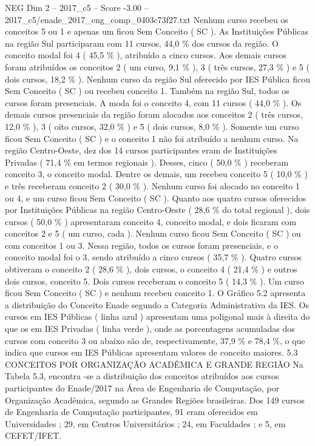 \begin{textsample}{NEG Dim 2 – 2017\_c5 – Score -3.00 – 2017\_c5/enade\_2017\_eng\_comp\_0403c73f27.txt}
Nenhum curso recebeu os conceitos 5 ou 1 e apenas um ficou Sem Conceito ( SC ).
As Instituições Públicas na região Sul participaram com 11 cursos, 44,0 \% dos cursos da região.
O conceito modal foi 4 ( 45,5 \% ), atribuído a cinco cursos.
Aos demais cursos foram atribuídos os conceitos 2 ( um curso, 9,1 \% ), 3 ( três cursos, 27,3 \% ) e 5 ( dois cursos, 18,2 \% ).
Nenhum curso da região Sul oferecido por IES Pública ficou Sem Conceito ( SC ) ou recebeu conceito 1.
Também na região Sul, todos os cursos foram presenciais.
A moda foi o conceito 4, com 11 cursos ( 44,0 \% ).
Os demais cursos presenciais da região foram alocados aos conceitos 2 ( três cursos, 12,0 \% ), 3 ( oito cursos, 32,0 \% ) e 5 ( dois cursos, 8,0 \% ).
Somente um curso ficou Sem Conceito ( SC ) e o conceito 1 não foi atribuído a nenhum curso.
Na região Centro-Oeste, dez dos 14 cursos participantes eram de Instituições Privadas ( 71,4 \% em termos regionais ).
Desses, cinco ( 50,0 \% ) receberam conceito 3, o conceito modal.
Dentre os demais, um recebeu conceito 5 ( 10,0 \% ) e três receberam conceito 2 ( 30,0 \% ).
Nenhum curso foi alocado no conceito 1 ou 4, e um curso ficou Sem Conceito ( SC ).
Quanto aos quatro cursos oferecidos por Instituições Públicas na região Centro-Oeste ( 28,6 \% do total regional ), dois cursos ( 50,0 \% ) apresentaram conceito 4, conceito modal, e dois ficaram com conceitos 2 e 5 ( um curso, cada ).
Nenhum curso ficou Sem Conceito ( SC ) ou com conceitos 1 ou 3.
Nessa região, todos os cursos foram presenciais, e o conceito modal foi o 3, sendo atribuído a cinco cursos ( 35,7 \% ).
Quatro cursos obtiveram o conceito 2 ( 28,6 \% ), dois cursos, o conceito 4 ( 21,4 \% ) e outros dois cursos, conceito 5.
Dois cursos receberam o conceito 5 ( 14,3 \% ).
Um curso ficou Sem Conceito ( SC ) e nenhum recebeu conceito 1.
O Gráfico 5.2 apresenta a distribuição do Conceito Enade segundo a Categoria Administrativa da IES.
Os cursos em IES Públicas ( linha azul ) apresentam uma poligonal mais à direita do que os em IES Privadas ( linha verde ), onde as porcentagens acumuladas dos cursos com conceito 3 ou abaixo são de, respectivamente, 37,9 \% e 78,4 \%, o que indica que cursos em IES Públicas apresentam valores de conceito maiores. 5.3 CONCEITOS POR ORGANIZAÇÃO ACADÊMICA E GRANDE REGIÃO Na Tabela 5.3, encontra -se a distribuição dos conceitos atribuídos aos cursos participantes do Enade/2017 na Área de Engenharia de Computação, por Organização Acadêmica, segundo as Grandes Regiões brasileiras.
Dos 149 cursos de Engenharia de Computação participantes, 91 eram oferecidos em Universidades ; 29, em Centros Universitários ; 24, em Faculdades ; e 5, em CEFET/IFET.

\end{textsample}
